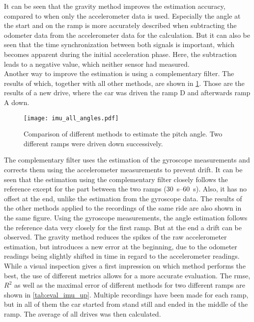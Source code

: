It can be seen that the gravity method improves the estimation accuracy, compared to when only the accelerometer data is used.
Especially the angle at the start and on the ramp is more accurately described when subtracting the odometer data from the accelerometer data for the calculation.
But it can also be seen that the time synchronization between both signals is important, which becomes apparent during the initial acceleration phase.
Here, the subtraction leads to a negative value, which neither sensor had measured.\\
Another way to improve the estimation is using a complementary filter.
The results of which, together with all other methods, are shown in \cref{fig:imu_all_angles}.
Those are the results of a new drive, where the car was driven the ramp D and afterwards ramp A down.
\begin{figure}[htb]
	\centering
	\texttt{[image: imu\_all\_angles.pdf]}
	\caption[Angle estimation using the gravity method]{Comparison of different methods to estimate the pitch angle. Two different ramps were driven down successively.}
	\label{fig:imu_all_angles}
\end{figure}
The complementary filter uses the estimation of the gyroscope measurements and corrects them using the accelerometer measurements to prevent drift.
It can be seen that the estimation using the complementary filter closely follows the reference except for the part between the two ramps (\SIrange{30}{60}{\second}).
Also, it has no offset at the end, unlike the estimation from the gyroscope data.
The results of the other methods applied to the recordings of the same ride are also shown in the same figure.
Using the gyroscope measurements, the angle estimation follows the reference data very closely for the first ramp.
But at the end a drift can be observed.
The gravity method reduces the spikes of the raw accelerometer estimation, but introduces a new error at the beginning, due to the odometer readings being slightly shifted in time in regard to the accelerometer readings.\\
While a visual inspection gives a first impression on which method performs the best, the use of different metrics allows for a more accurate evaluation.
The \gls{rmse}, $R^2$ as well as the maximal error of different methods for two different ramps are shown in \cref{tab:eval_imu_up}.
Multiple recordings have been made for each ramp, but in all of them the car started from stand still and ended in the middle of the ramp.
The average of all drives was then calculated.\\

